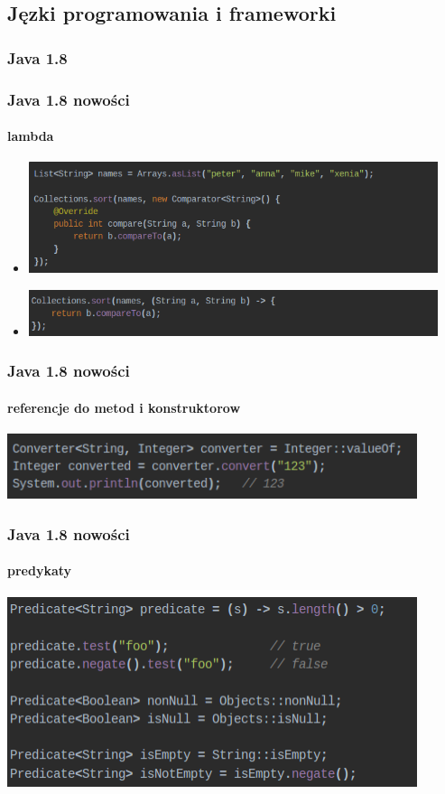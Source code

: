 \documentclass{beamer}
\begin{document}
\subsection{Jęzki programowania i frameworki}
\subsubsection{Java 1.8 }
\begin{frame}
\frametitle{Java 1.8 nowości }
\framesubtitle{lambda}
\begin{itemize}


\item \includegraphics[width=12cm]{lambda1.png}
\item  \includegraphics[width=12cm]{lambda2.png}
  \end{itemize}
  \end{frame}
  \begin{frame}
\frametitle{Java 1.8 nowości }
\framesubtitle{referencje do metod i konstruktorow}
    \includegraphics[width=12cm]{method_ref.png}
    \end{frame}
    \begin{frame}
\frametitle{Java 1.8 nowości }
\framesubtitle{predykaty}
     \includegraphics[width=12cm]{predicate.png}
     \end{frame}
\end{document}
